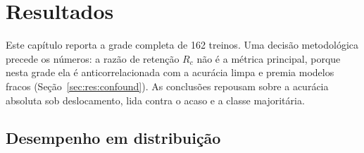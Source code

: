 \chapter{Resultados}
\label{ch:results}

Este capítulo reporta a grade completa de 162 treinos. Uma decisão metodológica
precede os números: a razão de retenção $R_c$ não é a métrica principal, porque
nesta grade ela é anticorrelacionada com a acurácia limpa e premia modelos fracos
(Seção~\ref{sec:res:confound}). As conclusões repousam sobre a acurácia absoluta
sob deslocamento, lida contra o acaso e a classe majoritária.

\section{Desempenho em distribuição}
\label{sec:res:clean}


